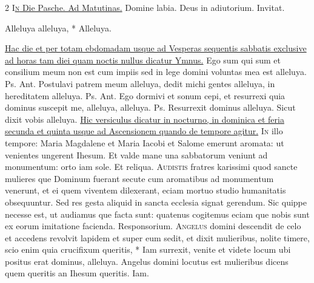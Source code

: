 \begin{multicols*}{2}
{\color{Red} }
\lettrine[lines=2]{\zallmancaps \color{Red} I}{}\ul{\textsc{n} Die Pasche. Ad Matutinas.} Domine labia. Deus in adiutorium. {\color{Red} Invitat.}
\begin{invitatory}
{Alleluya alleluya, * Alleluya.}
\end{invitatory}
\newline \ul{Hac die et per totam ebdomadam usque ad Vesperas sequentis sabbatis exclusive ad horas tam diei quam noctis nullus dicatur Ymnus.}
 Ego sum qui sum et consilium meum non est cum impiis sed in lege domini voluntas mea est alleluya. {\color{Red} Ps.}  {\color{Red} Ant.} Postulavi patrem meum alleluya, dedit michi gentes alleluya, in hereditatem alleluya. {\color{Red} Ps.}  {\color{Red} Ant.} Ego dormivi et sonum cepi, et resurrexi quia dominus suscepit me, alleluya, alleluya. {\color{Red} Ps.}  \V Resurrexit dominus alleluya. \R Sicut dixit vobis alleluya.
\newline \ul{Hic versiculus dicatur in nocturno, in dominica et feria secunda et quinta usque ad Ascensionem quando de tempore agitur.}
\lettrine[lines=2]{\zallmancaps \color{Blue} I}{n} illo tempore: Maria Magdalene et Maria Iacobi et Salome emerunt aromata: ut venientes ungerent Ihesum. Et valde mane una sabbatorum veniunt ad monumentum: orto iam sole. Et reliqua.
 \grecross
\lettrine[lines=2]{\zallmancaps \color{Red} A}{udistis} fratres karissimi quod sancte mulieres que Dominum fuerant secute cum aromatibus ad monumentum venerunt, et ei quem viventem dilexerant, eciam mortuo studio humanitatis obsequuntur. Sed res gesta aliquid in sancta ecclesia signat gerendum. Sic quippe necesse est, ut audiamus que facta sunt: quatenus cogitemus eciam que nobis sunt ex eorum imitatione facienda. {\color{Red} Responsorium.}
\lettrine[lines=2]{\zallmancaps \color{Blue} A}{ngelus} \hypertarget{angelus-domini-descendit}{\label{angelus-domini-descendit}} domini descendit de celo et accedens revolvit lapidem et super eum sedit, et dixit mulieribus, nolite timere, scio enim quia crucifixum queritis, * Iam surrexit, venite et videte locum ubi positus erat dominus, alleluya. \V Angelus domini locutus est mulieribus dicens quem queritis an Ihesum queritis. Iam.

\end{multicols*}
